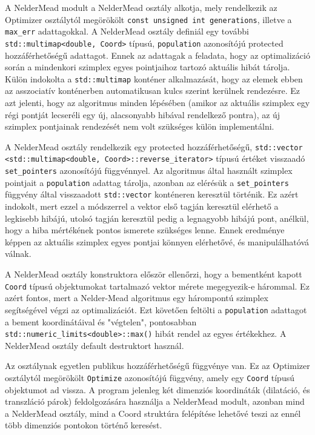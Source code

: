 \documentclass[oneside,titlepage,12pt,a4paper]{report}
\begin{document}
\par A NelderMead modult a NelderMead osztály alkotja, mely rendelkezik az Optimizer osztálytól megörökölt \texttt{const unsigned int generations}, illetve a \texttt{max\_err} adattagokkal. A NelderMead osztály definiál egy további \texttt{std::multimap<double, Coord>} típusú, \texttt{population} azonosítójú protected hozzáférhetőségű adattagot. Ennek az adattagak a feladata, hogy az optimalizáció során a mindenkori szimplex egyes pointjaihoz tartozó aktuális hibát tárolja. Külön indokolta a \texttt{std::multimap} konténer alkalmazását, hogy az elemek ebben az asszociatív konténerben automatikusan kulcs szerint kerülnek rendezésre. Ez azt jelenti, hogy az algoritmus minden lépésében (amikor az aktuális szimplex egy régi pontját lecseréli egy új, alacsonyabb hibával rendelkező pontra), az új szimplex pontjainak rendezését nem volt szükséges külön implementálni. 
\par A NelderMead osztály rendelkezik egy protected hozzáférhetőségű, \texttt{std::vector} \texttt{<std::multimap<double, Coord>::reverse\_iterator>} típusú értéket visszaadó \linebreak \texttt{set\_pointers} azonosítójú függvénnyel. Az algoritmus által használt szimplex pointjait a \texttt{population} adattag tárolja, azonban az elérésük a \texttt{set\_pointers} függvény által visszaadott \texttt{std::vector} konténeren keresztül történik. Ez azért indokolt, mert ezzel a módszerrel a vektor első tagján keresztül elérhető a legkisebb hibájú, utolsó tagján keresztül pedig a legnagyobb hibájú pont, anélkül, hogy a hiba mértékének pontos ismerete szükséges lenne. Ennek eredménye képpen az aktuális szimplex egyes pontjai könnyen elérhetővé, és manipulálhatóvá válnak. 

\par A NelderMead osztály konstruktora először ellenőrzi, hogy a bementként kapott \texttt{Coord} típusú objektumokat tartalmazó vektor mérete megegyezik-e hárommal. Ez azért fontos, mert a Nelder-Mead algoritmus egy hárompontú szimplex segítségével végzi az optimalizációt. Ezt követően feltölti a \texttt{population} adattagot a bement koordinátáival és "végtelen", pontosabban \texttt{std::numeric\_limits<double>::max()} hibát rendel az egyes értékekhez. A NelderMead osztály default destruktort használ. 
\par Az osztálynak egyetlen publikus hozzáférhetőségű függvénye van. Ez az Optimizer osztálytól megörökölt \texttt{Optimize} azonosítójú függvény, amely egy \texttt{Coord} típusú objektumot ad vissza. A program jelenleg két dimenziós koordináták (dilatáció, és transzláció párok) feldolgozására használja a NelderMead modult, azonban mind a NelderMead osztály, mind a Coord struktúra felépítése lehetővé teszi az ennél több dimenziós pontokon történő keresést. 
\end{document}
